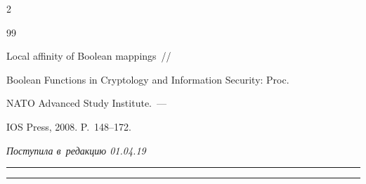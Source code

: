 \begin{multicols}{2}
{{\begin{thebibliography}{99}
        






        {Local affinity of Boolean mappings}~//


        Boolean Functions in Cryptology and Information Security: Proc.  


NATO Advanced Study Institute.~---


        IOS Press, 2008. P.~148--172.


        


 \end{thebibliography}





 }


 }





\end{multicols}





\vspace*{-5pt}





\hfill{\small\textit{Поступила в~редакцию 01.04.19}}





\vspace*{8pt}




















\hrule





\vspace*{2pt}





\hrule





